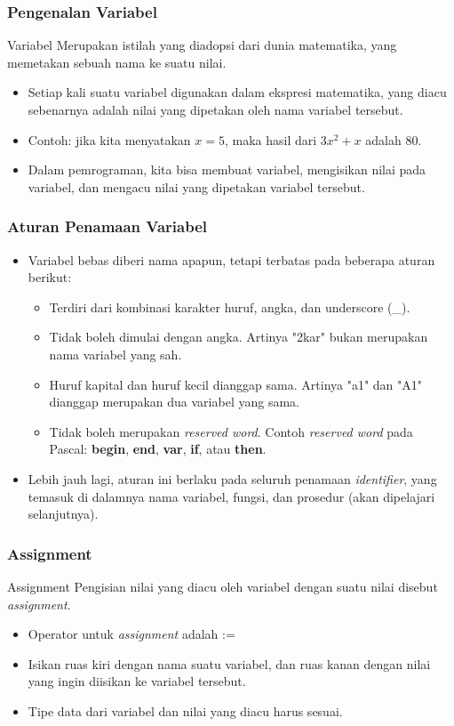 \documentclass{beamer}
\begin{document}
\begin{frame}[b]
\frametitle{Pengenalan Variabel}
\begin{block}{Variabel}
	 Merupakan istilah yang diadopsi dari dunia matematika, yang memetakan sebuah nama ke suatu nilai.
\end{block}
\begin{itemize}
	\item Setiap kali suatu variabel digunakan dalam ekspresi matematika, yang diacu sebenarnya adalah nilai yang dipetakan oleh nama variabel tersebut.
	\item Contoh: jika kita menyatakan $x=5$, maka hasil dari $3x^2 + x$ adalah $80$.
	\item Dalam pemrograman, kita bisa membuat variabel, mengisikan nilai pada variabel, dan mengacu nilai yang dipetakan variabel tersebut.
\end{itemize}
\end{frame}

\begin{frame}
\frametitle{Aturan Penamaan Variabel}
\begin{itemize}
	\item Variabel bebas diberi nama apapun, tetapi terbatas pada beberapa aturan berikut:
	\begin{itemize}
		\item Terdiri dari kombinasi karakter huruf, angka, dan underscore (\_).
		\item Tidak boleh dimulai dengan angka. Artinya "2kar" bukan merupakan nama variabel yang sah.
		\item Huruf kapital dan huruf kecil dianggap sama. Artinya "a1" dan "A1" dianggap merupakan dua variabel yang sama.
		\item Tidak boleh merupakan \alert{\textit{reserved word}}. Contoh \textit{reserved word} pada Pascal: \textbf{begin}, \textbf{end}, \textbf{var}, \textbf{if}, atau \textbf{then}.
	\end{itemize}
	\item Lebih jauh lagi, aturan ini berlaku pada seluruh penamaan \alert{\textit{identifier}}, yang temasuk di dalamnya nama variabel, fungsi, dan prosedur (akan dipelajari selanjutnya).
\end{itemize}
\end{frame}

\begin{frame}
\frametitle{Assignment}
\begin{block}{Assignment}
	Pengisian nilai yang diacu oleh variabel dengan suatu nilai disebut \alert{\textit{assignment}.}
\end{block}
\begin{itemize}
	\item Operator untuk \textit{assignment} adalah :=
	\item Isikan ruas kiri dengan nama suatu variabel, dan ruas kanan dengan nilai yang ingin diisikan ke variabel tersebut.
	\item Tipe data dari variabel dan nilai yang diacu \alert{harus sesuai}.
\end{itemize}
\end{frame}
\end{document}
